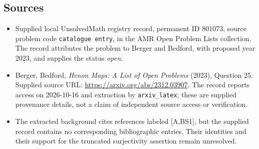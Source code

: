 \documentclass[11pt]{article}
\begin{document}
\subsection{Sources}
\begin{itemize}
\item Supplied local UnsolvedMath registry record, permanent ID $801073$, source problem code \texttt{catalogue entry}, in the AMR Open Problem Lists collection. The record attributes the problem to Berger and Bedford, with proposed year 2023, and supplies the status \emph{open}.
\item Berger, Bedford, \emph{Henon Maps: A List of Open Problems} (2023), Question 25. Supplied source URL: \url{https://arxiv.org/abs/2312.03907}. The record reports access on 2026-10-16 and extraction by \texttt{arxiv\_latex}; these are supplied provenance details, not a claim of independent source access or verification.
\item The extracted background cites references labeled [A,BS1], but the supplied record contains no corresponding bibliographic entries. Their identities and their support for the truncated surjectivity assertion remain unresolved.
\end{itemize}
\end{document}

